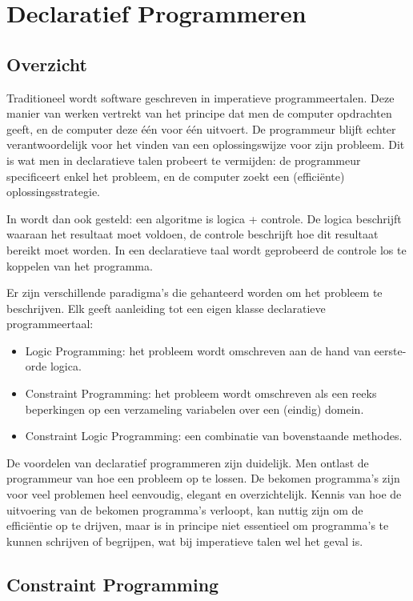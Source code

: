 \chapter{Declaratief Programmeren} \label{chap:decl}

\section{Overzicht} \label{sec:decl-overz}

Traditioneel wordt software geschreven in imperatieve programmeertalen. Deze manier van werken vertrekt van het principe dat men de computer opdrachten geeft, en de computer deze \'e\'en voor \'e\'en uitvoert. De programmeur blijft echter verantwoordelijk voor het vinden van een oplossingswijze voor zijn probleem. Dit is wat men in declaratieve talen probeert te vermijden: de programmeur specificeert enkel het probleem, en de computer zoekt een (effici\"ente) oplossingsstrategie.

In \cite{kowalski} wordt dan ook gesteld: een algoritme is logica + controle. De logica beschrijft waaraan het resultaat moet voldoen, de controle beschrijft hoe dit resultaat bereikt moet worden. In een declaratieve taal wordt geprobeerd de controle los te koppelen van het programma.

Er zijn verschillende paradigma's die gehanteerd worden om het probleem te beschrijven. Elk geeft aanleiding tot een eigen klasse declaratieve programmeertaal: \begin{itemize}
\item Logic Programming: het probleem wordt omschreven aan de hand van eerste-orde logica.
\item Constraint Programming: het probleem wordt omschreven als een reeks beperkingen op een verzameling variabelen over een (eindig) domein.
\item Constraint Logic Programming: een combinatie van bovenstaande methodes.
\end{itemize}

De voordelen van declaratief programmeren zijn duidelijk. Men ontlast de programmeur van hoe een probleem op te lossen. De bekomen programma's zijn voor veel problemen heel eenvoudig, elegant en overzichtelijk. Kennis van hoe de uitvoering van de bekomen programma's verloopt, kan nuttig zijn om de effici\"entie op te drijven, maar is in principe niet essentieel om programma's te kunnen schrijven of begrijpen, wat bij imperatieve talen wel het geval is.

\section{Constraint Programming}

